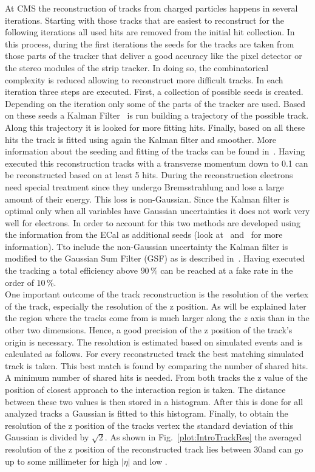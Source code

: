 At CMS the reconstruction of tracks from charged particles happens in several iterations. Starting with those tracks that are easiest to reconstruct for the following iterations all used hits are removed from the initial hit collection. In this process, during the first iterations the seeds for the tracks are taken from those parts of the tracker that deliver a good accuracy like the pixel detector or the stereo modules of the strip tracker. In doing so, the combinatorical complexity is reduced allowing to reconstruct more difficult tracks. In each iteration three steps are executed. First, a collection of possible seeds is created. Depending on the iteration only some of the parts of the tracker are used. Based on these seeds a Kalman Filter~\cite{Fruhwirth:1987fm} is run building a trajectory of the possible track. Along this trajectory it is looked for more fitting hits. Finally, based on all these hits the track is fitted using again the Kalman filter and smoother. More information about the seeding and fitting of the tracks can be found in~. Having executed this reconstruction tracks with a transverse momentum down to 0.1\GeV{} can be reconstructed based on at least 5 hits. During the reconstruction electrons need special treatment since they undergo Bremsstrahlung and lose a large amount of their energy. This loss is non-Gaussian. Since the Kalman filter is optimal only when all variables have Gaussian uncertainties it does not work very well for electrons. In order to account for this two methods are developed using the information from the ECal as additional seeds (look at~ and~ for more information). Tto include the non-Gaussian uncertainty the Kalman filter is modified to the Gaussian Sum Filter (GSF) as is described in~. Having executed the tracking a total efficiency above $90\,\%$ can be reached at a fake rate in the order of $10\,\%$. \\
One important outcome of the track reconstruction is the resolution of the vertex of the track, especially the resolution of the z position. As will be explained later the region where the tracks come from is much larger along the $z$ axis than in the other two dimensions. Hence, a good precision of the z position of the track's origin is necessary. The resolution is estimated based on simulated events and is calculated as follows. For every reconstructed track the best matching simulated track is taken. This best match is found by comparing the number of shared hits. A minimum number of shared hits is needed. From both tracks the z value of the position of closest approach to the interaction region is taken. The distance between these two values is then stored in a histogram. After this is done for all analyzed tracks a Gaussian is fitted to this histogram. Finally, to obtain the resolution of the z position of the tracks vertex the standard deviation of this Gaussian is divided by $\sqrt{2}$.  As shown in Fig.~\ref{plot:IntroTrackRes} the averaged resolution of the z position of the reconstructed track lies between 30\mum and can go up to some millimeter for high $\left|\eta\right|$ and low \pt{}.

